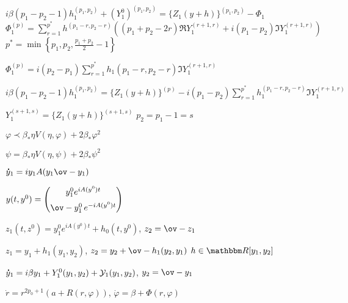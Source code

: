 \documentclass[hardcopy]{longnotes}
\begin{document}
\begin{list}
  \item $i \beta (p_1 - p_2 -1)h_1^{(p_1,p_2)} + {\left(Y_1^0\right)}^{(p_1,p_2)} =
    \{Z_1(y+h)\}^{(p_1,p_2)} - \Phi_1$ \\
    $\Phi_1^{(p)} 
    = \sum_{r=1}^{p^*} h^{(p_1-r,p_2-r)}\left(( p_1+p_2 -2r) \Re Y_1^{(r+1,r)} + i (p_1-p_2) \Im
    Y_1^{(r+1,r)}\right)$ \\
    $p^* = \min\left\{p_1,p_2, \frac{p_1+p_2}2-1\right\}$
  \item $\Phi_1^{(p)} = i(p_2-p_1)\sum_{r=1}^{p^*} h_1(p_1-r,p_2-r) \Im Y_1^{(r+1,r)}$
  \item $i \beta (p_1 - p_2 -1) h_1^{(p_1,p_2)} 
    = \{Z_1(y+h)\}^{(p)} - i (p_1-p_2) \sum_{r=1}^{p^*}h_1^{(p_1-r,p_2-r)} \Im Y_1^{(r+1,r)}$
  \item $Y_1^{(s+1,s)} = \{Z_1(y+h)\}^{(s+1,s)}$ \hfill $p_2 = p_1 -1=s$
  \item $\varphi \prec \beta_*  \eta V(\eta,\varphi) + 2 \beta_* \varphi^2 $
  \item $\psi =  \beta_*  \eta V(\eta,\psi) + 2 \beta_* \psi^2 $
  \item $\dot y_1 = i y_1 A(y_1 \ov-{y_1})$
\item $y(t,y^0)= \begin{pmatrix} y_1^0 e^{iA(y^0)t} \\[0.5em] \ov-{y_1^0}\, e^{-iA(y^0)t}\end{pmatrix}$
  \item $z_1(t,z^0) = y_1^0 e^{iA(y^0)t} + h_0(t,y^0)$, $z_2 = \ov-{z_1}$
  \item $z_1 = y_1 + h_1(y_1,y_2)$, $z_2 = y_2 + \ov-{h_1}(y_2,y_1)$ \hfill $h \in \R[y_1,y_2]$
  \item $\dot y_1 = i \beta y_1 + Y_1^0(y_1,y_2) + {\cal Y}_1(y_1,y_2)$, $y_2 = \ov-{y_1}$
  \item $\dot r = r^{2p_0+1} (a+R(r, \varphi))$, $\dot \varphi = \beta + \Phi(r,\varphi)$
\end{list}
\end{document}

